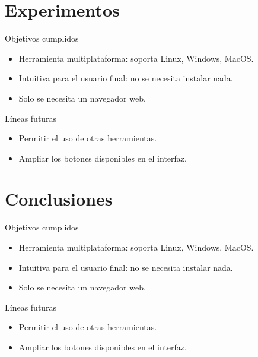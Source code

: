 \documentclass{beamer}
\begin{document}
\begin{frame}[plain]
\large{\titlepage}
\end{frame}

\section{Experimentos}
\begin{frame}
\begin{block}{Objetivos cumplidos}
\begin{itemize}
\item Herramienta multiplataforma: soporta Linux, Windows, MacOS.
\item Intuitiva para el usuario final: no se necesita instalar nada.
\item Solo se necesita un navegador web.
\end{itemize}
\end{block}

\begin{block}{Líneas futuras}
\begin{itemize}
\item Permitir el uso de otras herramientas.
\item Ampliar los botones disponibles en el interfaz.
\end{itemize}
\end{block}
\end{frame}

\begin{frame}[plain]
\large{\titlepage}
\end{frame}

\section{Conclusiones}
\begin{frame}
\begin{block}{Objetivos cumplidos}
\begin{itemize}
\item Herramienta multiplataforma: soporta Linux, Windows, MacOS.
\item Intuitiva para el usuario final: no se necesita instalar nada.
\item Solo se necesita un navegador web.
\end{itemize}
\end{block}

\begin{block}{Líneas futuras}
\begin{itemize}
\item Permitir el uso de otras herramientas.
\item Ampliar los botones disponibles en el interfaz.
\end{itemize}
\end{block}
\end{frame}

\begin{frame}[plain]
\large{\titlepage}
\end{frame}
\end{document}
